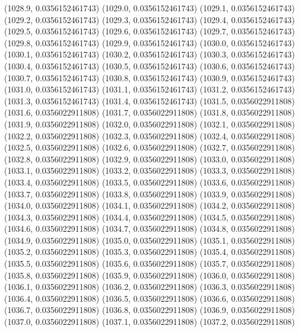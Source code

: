 {					(1028.9, 0.0356152461743)
					(1029.0, 0.0356152461743)
					(1029.1, 0.0356152461743)
					(1029.2, 0.0356152461743)
					(1029.3, 0.0356152461743)
					(1029.4, 0.0356152461743)
					(1029.5, 0.0356152461743)
					(1029.6, 0.0356152461743)
					(1029.7, 0.0356152461743)
					(1029.8, 0.0356152461743)
					(1029.9, 0.0356152461743)
					(1030.0, 0.0356152461743)
					(1030.1, 0.0356152461743)
					(1030.2, 0.0356152461743)
					(1030.3, 0.0356152461743)
					(1030.4, 0.0356152461743)
					(1030.5, 0.0356152461743)
					(1030.6, 0.0356152461743)
					(1030.7, 0.0356152461743)
					(1030.8, 0.0356152461743)
					(1030.9, 0.0356152461743)
					(1031.0, 0.0356152461743)
					(1031.1, 0.0356152461743)
					(1031.2, 0.0356152461743)
					(1031.3, 0.0356152461743)
					(1031.4, 0.0356152461743)
					(1031.5, 0.0356022911808)
					(1031.6, 0.0356022911808)
					(1031.7, 0.0356022911808)
					(1031.8, 0.0356022911808)
					(1031.9, 0.0356022911808)
					(1032.0, 0.0356022911808)
					(1032.1, 0.0356022911808)
					(1032.2, 0.0356022911808)
					(1032.3, 0.0356022911808)
					(1032.4, 0.0356022911808)
					(1032.5, 0.0356022911808)
					(1032.6, 0.0356022911808)
					(1032.7, 0.0356022911808)
					(1032.8, 0.0356022911808)
					(1032.9, 0.0356022911808)
					(1033.0, 0.0356022911808)
					(1033.1, 0.0356022911808)
					(1033.2, 0.0356022911808)
					(1033.3, 0.0356022911808)
					(1033.4, 0.0356022911808)
					(1033.5, 0.0356022911808)
					(1033.6, 0.0356022911808)
					(1033.7, 0.0356022911808)
					(1033.8, 0.0356022911808)
					(1033.9, 0.0356022911808)
					(1034.0, 0.0356022911808)
					(1034.1, 0.0356022911808)
					(1034.2, 0.0356022911808)
					(1034.3, 0.0356022911808)
					(1034.4, 0.0356022911808)
					(1034.5, 0.0356022911808)
					(1034.6, 0.0356022911808)
					(1034.7, 0.0356022911808)
					(1034.8, 0.0356022911808)
					(1034.9, 0.0356022911808)
					(1035.0, 0.0356022911808)
					(1035.1, 0.0356022911808)
					(1035.2, 0.0356022911808)
					(1035.3, 0.0356022911808)
					(1035.4, 0.0356022911808)
					(1035.5, 0.0356022911808)
					(1035.6, 0.0356022911808)
					(1035.7, 0.0356022911808)
					(1035.8, 0.0356022911808)
					(1035.9, 0.0356022911808)
					(1036.0, 0.0356022911808)
					(1036.1, 0.0356022911808)
					(1036.2, 0.0356022911808)
					(1036.3, 0.0356022911808)
					(1036.4, 0.0356022911808)
					(1036.5, 0.0356022911808)
					(1036.6, 0.0356022911808)
					(1036.7, 0.0356022911808)
					(1036.8, 0.0356022911808)
					(1036.9, 0.0356022911808)
					(1037.0, 0.0356022911808)
					(1037.1, 0.0356022911808)
					(1037.2, 0.0356022911808)
}
